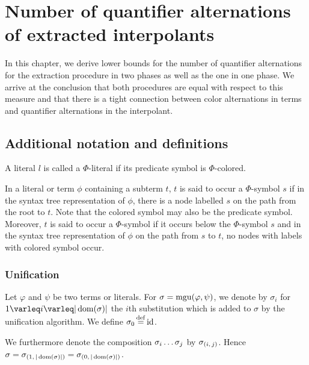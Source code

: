 \documentclass[%
	draft=false,%
	numbers=noendperiod,%
	11pt,%
	a4paper,%
	oneside,%
	openany,%
]{memoir}
\begin{document}
\chapter{ Number of quantifier alternations of extracted interpolants }

In this chapter, we derive lower bounds for the number of quantifier alternations for the extraction procedure in two phases as well as the one in one phase.
We arrive at the conclusion that both procedures are equal with respect to this measure and that there is a tight connection between color alternations in terms and quantifier alternations in the interpolant.



\section{Additional notation and definitions}

A literal $l$ is called a $\Phi$-literal if its predicate symbol is $\Phi$-colored.

In a literal or term $\phi$ containing a subterm $t$, $t$ is said to occur  a $\Phi$-symbol $s$ if in the syntax tree representation of $\phi$, there is a node labelled $s$ on the path from the root to $t$. Note that the colored symbol may also be the predicate symbol.
Moreover, $t$ is said to occur  a $\Phi$-symbol if it occurs below the $\Phi$-symbol $s$ and in the syntax tree representation of $\phi$ on the path from $s$ to $t$, no nodes with labels with colored symbol occur.


\subsection{Unification}

Let $\varphi$ and $\psi$ be two terms or literals.
For $\sigma = \operatorname{mgu}(\varphi, \psi)$, we denote by $\sigma_i$ for $1\varleq i \varleq |\dom(\sigma)|$ the $i$th substitution which is added to $\sigma$ by the unification algorithm.
We define $\sigma_0 \defeq \id$.

We furthermore denote the composition $\sigma_i \dots \sigma_j$ by $\sigma_{(i,\,j)}$.
Hence $\sigma = \sigma_{(1,\,|\operatorname{dom}(\sigma)|)} = \sigma_{(0,\,|\operatorname{dom}(\sigma)|)}$.
\end{document}
